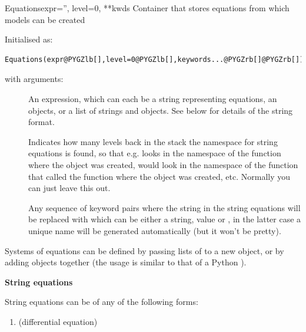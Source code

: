 \documentclass[letterpaper,10pt,english]{manual}
\begin{document}
\hypertarget{brian.Equations}{}\begin{classdesc}{Equations}{expr='', level=0, **kwds}
Container that stores equations from which models can be created

Initialised as:

\begin{Verbatim}[commandchars=@\[\]]
Equations(expr@PYGZlb[],level=0@PYGZlb[],keywords...@PYGZrb[]@PYGZrb[])
\end{Verbatim}

with arguments:
\begin{description}
\item[] \leavevmode
An expression, which can each be a string representing equations,
an \hyperlink{brian.Equations}{} objects, or a list of strings and \hyperlink{brian.Equations}{} objects.
See below for details of the string format.

\item[] \leavevmode
Indicates how many levels back in the stack the namespace for string
equations is found, so that e.g.  looks in the
namespace of the function where the \hyperlink{brian.Equations}{} object was created,
 would look in the namespace of the function that called the
function where the \hyperlink{brian.Equations}{} object was created, etc.
Normally you can just leave this out.

\item[] \leavevmode
Any sequence of keyword pairs  where the string 
in the string equations will be replaced with  which can
be either a string, value or , in the latter case a unique
name will be generated automatically (but it won't be pretty).

\end{description}

Systems of equations can be defined by passing lists of \hyperlink{brian.Equations}{} to a
new \hyperlink{brian.Equations}{} object, or by adding \hyperlink{brian.Equations}{} objects together (the usage
is similar to that of a Python ).

\textbf{String equations}

String equations can be of any of the following forms:
\begin{enumerate}
\item {} 
 (differential equation)


\end{enumerate}
\end{classdesc}
\end{document}
